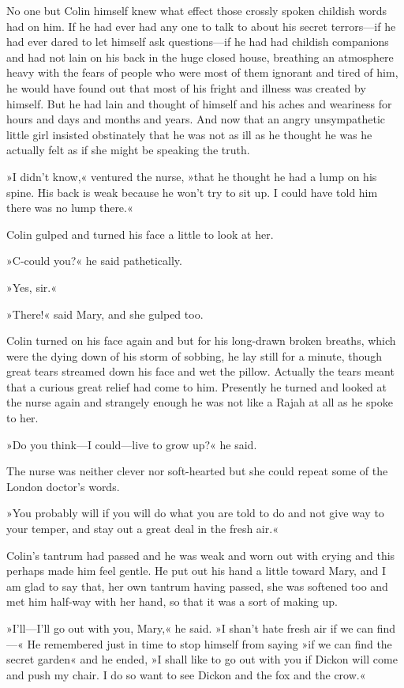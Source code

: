 No one but Colin himself knew what effect those crossly spoken childish words had on him. If he had ever had any one to talk to about his secret terrors—if he had ever dared to let himself ask questions—if he had had childish companions and had not lain on his back in the huge closed house, breathing an atmosphere heavy with the fears of people who were most of them ignorant and tired of him, he would have found out that most of his fright and illness was created by himself. But he had lain and thought of himself and his aches and weariness for hours and days and months and years. And now that an angry unsympathetic little girl insisted obstinately that he was not as ill as he thought he was he actually felt as if she might be speaking the truth.

»I didn't know,« ventured the nurse, »that he thought he had a lump on his spine. His back is weak because he won't try to sit up. I could have told him there was no lump there.«

Colin gulped and turned his face a little to look at her.

»C-could you?« he said pathetically.

»Yes, sir.«

»There!« said Mary, and she gulped too.

Colin turned on his face again and but for his long-drawn broken breaths, which were the dying down of his storm of sobbing, he lay still for a minute, though great tears streamed down his face and wet the pillow. Actually the tears meant that a curious great relief had come to him. Presently he turned and looked at the nurse again and strangely enough he was not like a Rajah at all as he spoke to her.

»Do you think—I could—live to grow up?« he said.

The nurse was neither clever nor soft-hearted but she could repeat some of the London doctor's words.

»You probably will if you will do what you are told to do and not give way to your temper, and stay out a great deal in the fresh air.«

Colin's tantrum had passed and he was weak and worn out with crying and this perhaps made him feel gentle. He put out his hand a little toward Mary, and I am glad to say that, her own tantrum having passed, she was softened too and met him half-way with her hand, so that it was a sort of making up.

»I'll—I'll go out with you, Mary,« he said. »I shan't hate fresh air if we can find—« He remembered just in time to stop himself from saying »if we can find the secret garden« and he ended, »I shall like to go out with you if Dickon will come and push my chair. I do so want to see Dickon and the fox and the crow.«

